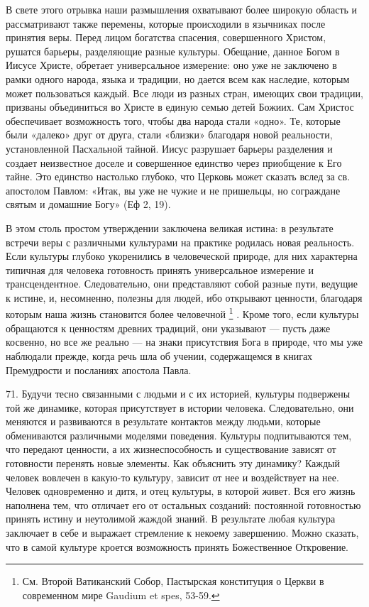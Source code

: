 \documentclass[a5paper,10pt]{article}
\begin{document}
В свете этого отрывка наши размышления охватывают более широкую область и
рассматривают также перемены, которые происходили в язычниках после принятия
веры. Перед лицом богатства спасения, совершенного Христом, рушатся барьеры,
разделяющие разные культуры. Обещание, данное Богом в Иисусе Христе, обретает
универсальное измерение: оно уже не заключено в рамки одного народа, языка и
традиции, но дается всем как наследие, которым может пользоваться каждый. Все
люди из разных стран, имеющих свои традиции, призваны объединиться во Христе в
единую семью детей Божиих. Сам Христос обеспечивает возможность того, чтобы два
народа стали «одно». Те, которые были «далеко» друг от друга, стали «близки»
благодаря новой реальности, установленной Пасхальной тайной. Иисус разрушает
барьеры разделения и создает неизвестное доселе и совершенное единство через
приобщение к Его тайне. Это единство настолько глубоко, что Церковь может
сказать вслед за св. апостолом Павлом: «Итак, вы уже не чужие и не пришельцы,
но сограждане святым и домашние Богу» (Еф 2, 19).

В этом столь простом утверждении заключена великая истина: в результате встречи
веры с различными культурами на практике родилась новая реальность. Если
культуры глубоко укоренились в человеческой природе, для них характерна
типичная для человека готовность принять универсальное измерение и
трансцендентное. Следовательно, они представляют собой разные пути, ведущие к
истине, и, несомненно, полезны для людей, ибо открывают ценности, благодаря
которым наша жизнь становится более человечной \footnote{См. Второй Ватиканский
Собор, Пастырская конституция о Церкви в современном мире Gaudium et spes,
53-59.} . Кроме того, если культуры обращаются к ценностям древних традиций,
они указывают — пусть даже косвенно, но все же реально — на знаки присутствия
Бога в природе, что мы уже наблюдали прежде, когда речь шла об учении,
содержащемся в книгах Премудрости и посланиях апостола Павла.

71. Будучи тесно связанными с людьми и с их историей, культуры подвержены той
же динамике, которая присутствует в истории человека. Следовательно, они
меняются и развиваются в результате контактов между людьми, которые
обмениваются различными моделями поведения. Культуры подпитываются тем, что
передают ценности, а их жизнеспособность и существование зависят от готовности
перенять новые элементы. Как объяснить эту динамику? Каждый человек вовлечен в
какую-то культуру, зависит от нее и воздействует на нее. Человек одновременно и
дитя, и отец культуры, в которой живет. Вся его жизнь наполнена тем, что
отличает его от остальных созданий: постоянной готовностью принять истину и
неутолимой жаждой знаний. В результате любая культура заключает в себе и
выражает стремление к некоему завершению. Можно сказать, что в самой культуре
кроется возможность принять Божественное Откровение.
\end{document}
